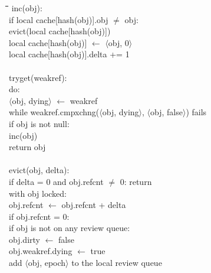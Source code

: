 \begin{figure}
  \def\fgap{-0.25em}            %
  \begin{tabbing}
    \quad\=\quad\=\quad\=\quad\=\quad\=\quad\=\kill
    inc(obj): \+\\
      if local cache[hash(obj)].obj $\ne$ obj: \+\\
        evict(local cache[hash(obj)]) \\
        local cache[hash(obj)] $\gets$ $\langle$obj, 0$\rangle$ \-\\
      local cache[hash(obj)].delta += 1 \\
    \-\\[\fgap]
    tryget(weakref): \+\\
      do: \+\\
        $\langle$obj, dying$\rangle$ $\gets$ weakref \-\\
      while weakref.cmpxchng($\langle$obj, dying$\rangle$,
        $\langle$obj, false$\rangle$) fails \\
      if obj is not null: \+\\
        inc(obj) \-\\
      return obj \\
    \-\\[\fgap]
    evict(obj, delta): \+\\
      if delta = 0 and obj.refcnt $\ne$ 0: return \\
      with obj locked: \+\\
        obj.refcnt $\gets$ obj.refcnt + delta \\
        if obj.refcnt = 0: \+\\
          if obj is not on any review queue: \+\\
            obj.dirty $\gets$ false \\
            obj.weakref.dying $\gets$ true \\
            add $\langle$obj, epoch$\rangle$ to the local review
            queue \-\\

\end{tabbing}
\end{figure}
